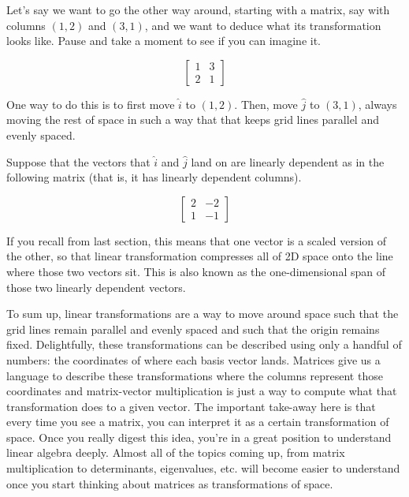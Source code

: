Let's say we want to go the other way around, starting with a matrix, say with
columns $(1, 2)$ and $(3, 1)$, and we want to deduce what its transformation
looks like. Pause and take a moment to see if you can imagine it.

\begin{equation*}
  \begin{bmatrix}
    1 & 3 \\
    2 & 1
  \end{bmatrix}
\end{equation*}

One way to do this is to first move $\hat{i}$ to $(1, 2)$. Then, move $\hat{j}$
to $(3, 1)$, always moving the rest of space in such a way that that keeps grid
lines parallel and evenly spaced.

Suppose that the vectors that $\hat{i}$ and $\hat{j}$ land on are linearly
dependent as in the following matrix (that is, it has linearly dependent
columns).

\begin{equation*}
  \begin{bmatrix}
    2 & -2 \\
    1 & -1
  \end{bmatrix}
\end{equation*}

If you recall from last section, this means that one vector is a scaled version
of the other, so that linear transformation compresses all of 2D space onto the
line where those two vectors sit. This is also known as the one-dimensional span
of those two linearly dependent vectors.

To sum up, linear transformations are a way to move around space such that the
grid lines remain parallel and evenly spaced and such that the origin remains
fixed. Delightfully, these transformations can be described using only a handful
of numbers: the coordinates of where each basis vector lands. Matrices give us a
language to describe these transformations where the columns represent those
coordinates and matrix-vector multiplication is just a way to compute what that
transformation does to a given vector. The important take-away here is that
every time you see a matrix, you can interpret it as a certain transformation of
space. Once you really digest this idea, you're in a great position to
understand linear algebra deeply. Almost all of the topics coming up, from
matrix multiplication to determinants, eigenvalues, etc. will become easier to
understand once you start thinking about matrices as transformations of space.
